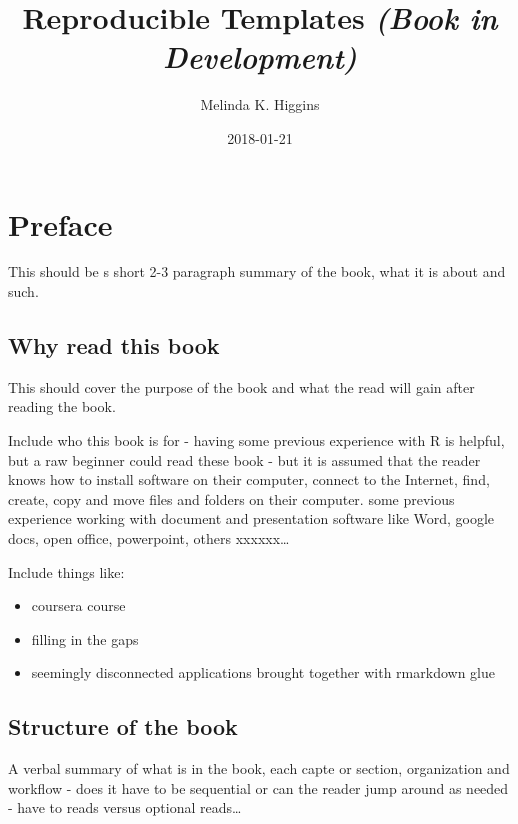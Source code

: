 \documentclass[]{book}
\title{Reproducible Templates \emph{(Book in Development)}}
\author{Melinda K. Higgins}
\date{2018-01-21}
\providecommand{\tightlist}{%
  \setlength{\itemsep}{0pt}\setlength{\parskip}{0pt}}
\theoremstyle{definition}
\theoremstyle{definition}
\theoremstyle{definition}
\theoremstyle{remark}
\begin{document}
\maketitle

{
\setcounter{tocdepth}{1}
\tableofcontents
}
\listoftables
\listoffigures
\chapter*{Preface}\label{preface}

This should be s short 2-3 paragraph summary of the book, what it is
about and such.

\section*{Why read this book}\label{why-read-this-book}

This should cover the purpose of the book and what the read will gain
after reading the book.

Include who this book is for - having some previous experience with R is
helpful, but a raw beginner could read these book - but it is assumed
that the reader knows how to install software on their computer, connect
to the Internet, find, create, copy and move files and folders on their
computer. some previous experience working with document and
presentation software like Word, google docs, open office, powerpoint,
others xxxxxx\ldots{}

Include things like:

\begin{itemize}
\tightlist
\item
  coursera course
\item
  filling in the gaps
\item
  seemingly disconnected applications brought together with rmarkdown
  glue
\end{itemize}

\section*{Structure of the book}\label{structure-of-the-book}

A verbal summary of what is in the book, each capte or section,
organization and workflow - does it have to be sequential or can the
reader jump around as needed - have to reads versus optional
reads\ldots{}
\end{document}
